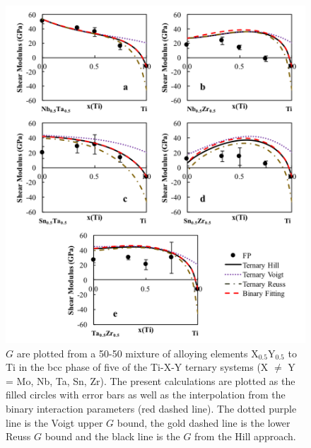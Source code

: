 \pagebreak
\begin{figure}[H]
	\centering
	\includegraphics[width=\textwidth]{Chapter-6/Figures/tixyshear2.png}
	\caption{$G$ are plotted from a 50-50 mixture of alloying elements X$_{0.5}$Y$_{0.5}$ to Ti in the bcc phase of five of the Ti-X-Y ternary systems (X $\neq$ Y = Mo, Nb, Ta, Sn, Zr). The present calculations are plotted as the filled circles with error bars as well as the interpolation from the binary interaction parameters (red dashed line). The dotted purple line is the Voigt upper $G$ bound, the gold dashed line is the lower Reuss $G$ bound and the black line is the $G$ from the Hill approach.}
	\label{Ch6-figure:tixyshear2}
\end{figure}

